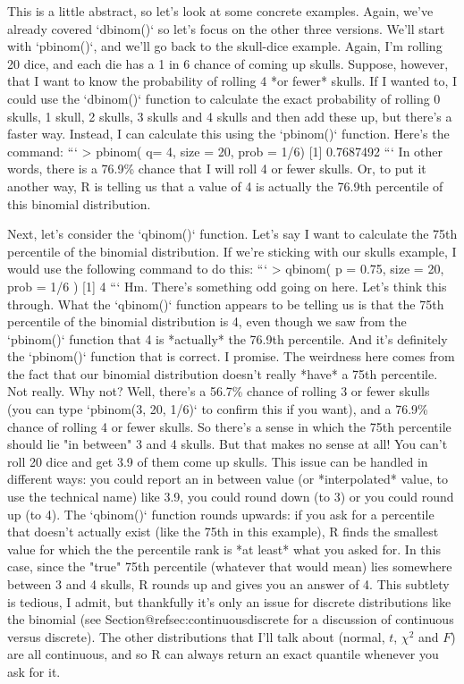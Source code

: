 This is a little abstract, so let's look at some concrete examples. Again, we've already covered `dbinom()` so let's focus on the other three versions. We'll start with `pbinom()`, and we'll go back to the skull-dice example. Again, I'm rolling 20 dice, and each die has a 1 in 6 chance of coming up skulls. Suppose, however, that I want to know the probability of rolling 4 *or fewer* skulls. If I wanted to, I could use the `dbinom()` function to calculate the exact probability of rolling 0 skulls, 1 skull, 2 skulls, 3 skulls and 4 skulls and then add these up, but there's a faster way. Instead, I can calculate this using the `pbinom()` function. Here's the command:
```
> pbinom( q= 4, size = 20, prob = 1/6)
[1] 0.7687492
```
In other words, there is a 76.9\% chance that I will roll 4 or fewer skulls. Or, to put it another way, R is telling us that a value of 4 is actually the 76.9th percentile of this binomial distribution.

Next, let's consider the `qbinom()` function. Let's say I want to calculate the 75th percentile of the binomial distribution. If we're sticking with our skulls example, I would use the following command to do this: 
```
> qbinom( p = 0.75, size = 20, prob = 1/6 )
[1] 4
```
Hm. There's something odd going on here. Let's think this through. What the `qbinom()` function appears to be telling us is that the 75th percentile of the binomial distribution is 4, even though we saw from the `pbinom()` function that 4 is *actually* the 76.9th percentile. And it's definitely the `pbinom()` function that is correct. I promise. The weirdness here comes from the fact that our binomial distribution doesn't really *have* a 75th percentile. Not really. Why not? Well, there's a 56.7\% chance of rolling 3 or fewer skulls (you can type `pbinom(3, 20, 1/6)` to confirm this if you want), and a 76.9\% chance of rolling 4 or fewer skulls. So there's a sense in which the 75th percentile should lie "in between" 3 and 4 skulls. But that makes no sense at all! You can't roll 20 dice and get 3.9 of them come up skulls. This issue can be handled in different ways: you could report an in between value (or *interpolated* value, to use the technical name) like 3.9, you could round down (to 3) or you could round up (to 4). The `qbinom()` function rounds upwards: if you ask for a percentile that doesn't actually exist (like the 75th in this example), R finds the smallest value for which the the percentile rank is *at least* what you asked for. In this case, since the "true" 75th percentile (whatever that would mean) lies somewhere between 3 and 4 skulls, R rounds up and gives you an answer of 4. This subtlety is tedious, I admit, but thankfully it's only an issue for discrete distributions like the binomial (see Section@refsec:continuousdiscrete for a discussion of continuous versus discrete). The other distributions that I'll talk about (normal, $t$, $\chi^2$ and $F$) are all continuous, and so R can always return an exact quantile whenever you ask for it.  

